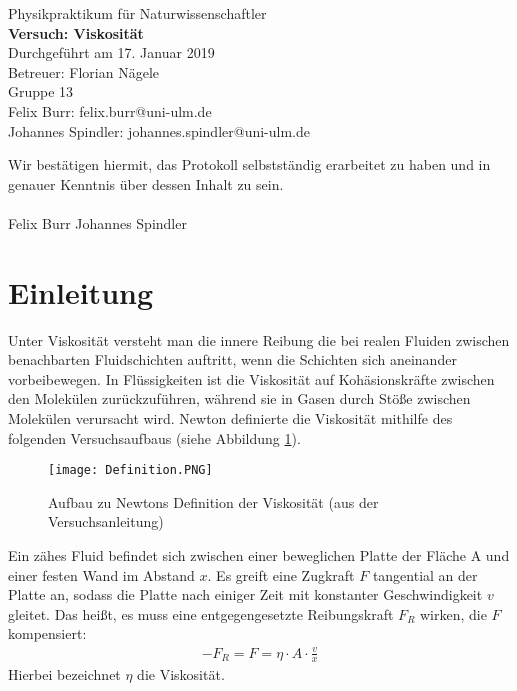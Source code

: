 \documentclass{scrartcl}
\begin{document}
\begin{titlepage}
  \begin{center}
    \vspace*{1cm}
    \LARGE
    Physikpraktikum für Naturwissenschaftler \\
    \vspace*{1cm}
    \Huge
    \textbf{Versuch: Viskosität} \\
    \vspace*{0.3cm}
    \Large
    Durchgeführt am 17. Januar 2019 \\
    Betreuer: Florian Nägele \\
    \vspace*{2.5cm}
    Gruppe 13 \\
    Felix Burr: felix.burr@uni-ulm.de \\
    Johannes Spindler: johannes.spindler@uni-ulm.de \\
    \vfill 
  \end{center}
  Wir bestätigen hiermit, das Protokoll selbstständig erarbeitet zu haben und in genauer Kenntnis über dessen Inhalt zu sein. \\
  \vspace*{0.8cm}
  \\
  Felix Burr
  \hfill
  Johannes Spindler
\end{titlepage}
\pagebreak
\tableofcontents


\pagebreak

\section{Einleitung}
Unter Viskosität versteht man die innere Reibung die bei realen Fluiden  zwischen benachbarten Fluidschichten auftritt, wenn die Schichten sich aneinander vorbeibewegen. In Flüssigkeiten ist die Viskosität auf Kohäsionskräfte zwischen den Molekülen zurückzuführen, während sie in Gasen durch Stöße zwischen Molekülen verursacht wird. 
Newton definierte die Viskosität mithilfe des folgenden Versuchsaufbaus (siehe Abbildung \ref{fig:Definition}).

\begin{figure}[H]
  \centering
    \texttt{[image: Definition.PNG]}
  \caption{Aufbau zu Newtons Definition der Viskosität (aus der Versuchsanleitung)}
  \label{fig:Definition}
\end{figure}

Ein zähes Fluid befindet sich zwischen einer beweglichen Platte der Fläche A und einer festen Wand im Abstand $x$. Es greift eine Zugkraft $F$ tangential an der Platte an, sodass die Platte nach einiger Zeit mit konstanter Geschwindigkeit $v$ gleitet. Das heißt, es muss eine entgegengesetzte Reibungskraft $F_{R}$ wirken, die $F$ kompensiert:
\begin{align}
-F_{R} = F = \eta \cdot A \cdot \frac{v}{x}
\end{align}
Hierbei bezeichnet $\eta$ die Viskosität.
\end{document}
